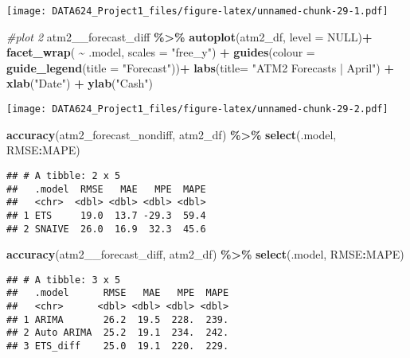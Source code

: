 \documentclass[
]{article}
\newenvironment{Shaded}{\begin{snugshade}}{\end{snugshade}}
\newcommand{\AttributeTok}[1]{\textcolor[rgb]{0.13,0.29,0.53}{#1}}
\newcommand{\CommentTok}[1]{\textcolor[rgb]{0.56,0.35,0.01}{\textit{#1}}}
\newcommand{\ConstantTok}[1]{\textcolor[rgb]{0.56,0.35,0.01}{#1}}
\newcommand{\FunctionTok}[1]{\textcolor[rgb]{0.13,0.29,0.53}{\textbf{#1}}}
\newcommand{\NormalTok}[1]{#1}
\newcommand{\SpecialCharTok}[1]{\textcolor[rgb]{0.81,0.36,0.00}{\textbf{#1}}}
\newcommand{\StringTok}[1]{\textcolor[rgb]{0.31,0.60,0.02}{#1}}
\begin{document}
\texttt{[image: DATA624\_Project1\_files/figure-latex/unnamed-chunk-29-1.pdf]}

\begin{Shaded}
\begin{Highlighting}[]
\CommentTok{\#plot 2}
\NormalTok{atm2\_\_forecast\_diff }\SpecialCharTok{\%\textgreater{}\%}
  \FunctionTok{autoplot}\NormalTok{(atm2\_df, }\AttributeTok{level =} \ConstantTok{NULL}\NormalTok{)}\SpecialCharTok{+}
  \FunctionTok{facet\_wrap}\NormalTok{( }\SpecialCharTok{\textasciitilde{}}\NormalTok{ .model, }\AttributeTok{scales =} \StringTok{"free\_y"}\NormalTok{) }\SpecialCharTok{+}
  \FunctionTok{guides}\NormalTok{(}\AttributeTok{colour =} \FunctionTok{guide\_legend}\NormalTok{(}\AttributeTok{title =} \StringTok{"Forecast"}\NormalTok{))}\SpecialCharTok{+}
  \FunctionTok{labs}\NormalTok{(}\AttributeTok{title=} \StringTok{"ATM2 Forecasts | April"}\NormalTok{) }\SpecialCharTok{+}
  \FunctionTok{xlab}\NormalTok{(}\StringTok{"Date"}\NormalTok{) }\SpecialCharTok{+}
  \FunctionTok{ylab}\NormalTok{(}\StringTok{"Cash"}\NormalTok{)}
\end{Highlighting}
\end{Shaded}

\texttt{[image: DATA624\_Project1\_files/figure-latex/unnamed-chunk-29-2.pdf]}

\begin{Shaded}
\begin{Highlighting}[]
\FunctionTok{accuracy}\NormalTok{(atm2\_forecast\_nondiff, atm2\_df) }\SpecialCharTok{\%\textgreater{}\%}
  \FunctionTok{select}\NormalTok{(.model, RMSE}\SpecialCharTok{:}\NormalTok{MAPE)}
\end{Highlighting}
\end{Shaded}

\begin{verbatim}
## # A tibble: 2 x 5
##   .model  RMSE   MAE   MPE  MAPE
##   <chr>  <dbl> <dbl> <dbl> <dbl>
## 1 ETS     19.0  13.7 -29.3  59.4
## 2 SNAIVE  26.0  16.9  32.3  45.6
\end{verbatim}

\begin{Shaded}
\begin{Highlighting}[]
\FunctionTok{accuracy}\NormalTok{(atm2\_\_forecast\_diff, atm2\_df) }\SpecialCharTok{\%\textgreater{}\%}
  \FunctionTok{select}\NormalTok{(.model, RMSE}\SpecialCharTok{:}\NormalTok{MAPE)}
\end{Highlighting}
\end{Shaded}

\begin{verbatim}
## # A tibble: 3 x 5
##   .model      RMSE   MAE   MPE  MAPE
##   <chr>      <dbl> <dbl> <dbl> <dbl>
## 1 ARIMA       26.2  19.5  228.  239.
## 2 Auto ARIMA  25.2  19.1  234.  242.
## 3 ETS_diff    25.0  19.1  220.  229.
\end{verbatim}
\end{document}
